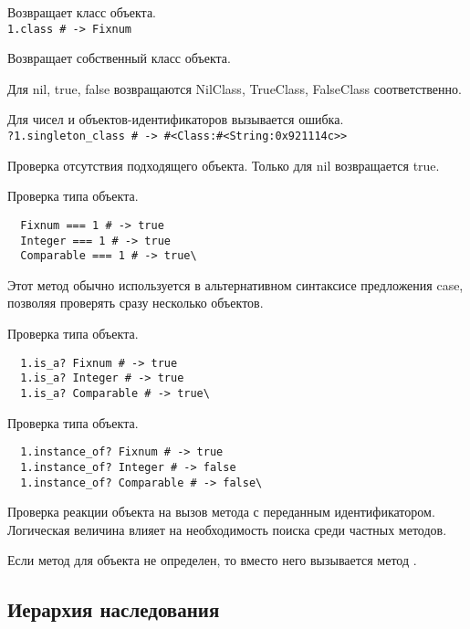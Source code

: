 \begin{methodlist}
  Возвращает класс объекта. 
  \\\verb!1.class # -> Fixnum!
 
  Возвращает собственный класс объекта.

  Для nil, true, false возвращаются NilClass, TrueClass, FalseClass соответственно. 

  Для чисел и объектов-идентификаторов вызывается ошибка. 
  \\\verb!?1.singleton_class # -> #<Class:#<String:0x921114c>>!

  Проверка отсутствия подходящего объекта. Только для nil возвращается true.

  Проверка типа объекта.
  \begin{verbatim}
  Fixnum === 1 # -> true 
  Integer === 1 # -> true 
  Comparable === 1 # -> true\
  \end{verbatim}
  Этот метод обычно используется в альтернативном синтаксисе предложения case, позволяя проверять сразу несколько объектов.

  Проверка типа объекта.
  \begin{verbatim}
  1.is_a? Fixnum # -> true 
  1.is_a? Integer # -> true 
  1.is_a? Comparable # -> true\
  \end{verbatim}  

  Проверка типа объекта. 
  \begin{verbatim}
  1.instance_of? Fixnum # -> true 
  1.instance_of? Integer # -> false
  1.instance_of? Comparable # -> false\
  \end{verbatim}

  Проверка реакции объекта на вызов метода с переданным идентификатором. Логическая величина влияет на необходимость поиска среди частных методов.

  Если метод для объекта не определен, то вместо него вызывается метод . 
\end{methodlist}

\subsection{Иерархия наследования}

